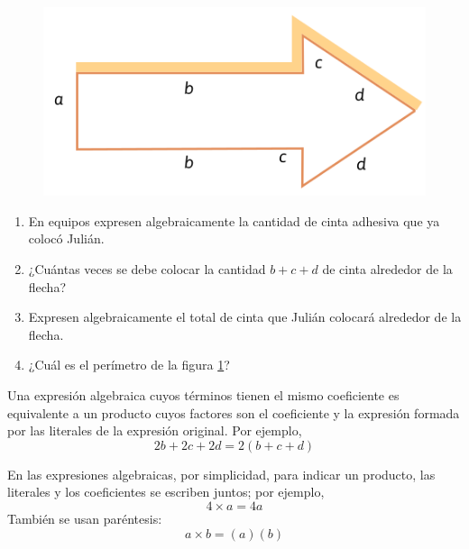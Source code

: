 \documentclass[11pt]{book}
\begin{document}
\begin{enumerate}
        \begin{minipage}[t]{0.3\textwidth}
          \begin{figure}[H]
            \centering
            \includegraphics[width=\linewidth]{flecha.png}
            \label{fig:flecha}
          \end{figure}
        \end{minipage}\hfill
        \begin{minipage}[t]{0.7\textwidth}
          \begin{enumerate}
            \item En equipos expresen algebraicamente la cantidad de cinta adhesiva que ya colocó Julián.
            \item ¿Cuántas veces se debe colocar la cantidad $b + c + d$ de cinta alrededor de la flecha?
            \item Expresen algebraicamente el total de cinta que Julián colocará alrededor de la flecha.
            \item ¿Cuál es el perímetro de la figura \ref{fig:flecha}?
          \end{enumerate}
        \end{minipage}

        \begin{boxH}
          Una expresión algebraica cuyos términos tienen el mismo coeficiente es
          equivalente a un producto cuyos factores son el coeficiente y la expresión formada por
          las literales de la expresión original. Por ejemplo,
          \[ 2b + 2c + 2d = 2(b + c + d)\]
        \end{boxH}

        \begin{boxE}
          En las expresiones algebraicas, por simplicidad, para indicar un producto, las literales y los
          coeficientes se escriben juntos; por ejemplo,\\
          \[ 4 \times a = 4a \]
          También se usan paréntesis:\\
          \[ a \times b = (a) (b)\]
        \end{boxE}


\end{enumerate}
\end{document}
